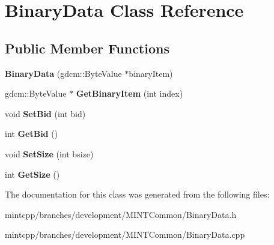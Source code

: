 \hypertarget{class_binary_data}{
\section{BinaryData Class Reference}
\label{class_binary_data}
}
\subsection*{Public Member Functions}
\begin{DoxyCompactItemize}
\item 
\hypertarget{class_binary_data_a21716fb138f92e5a4445ae1cb32dc981}{
{\bfseries BinaryData} (gdcm::ByteValue $\ast$binaryItem)}
\label{class_binary_data_a21716fb138f92e5a4445ae1cb32dc981}

\item 
\hypertarget{class_binary_data_ac204b216282db31e2eff91be6c89a729}{
gdcm::ByteValue $\ast$ {\bfseries GetBinaryItem} (int index)}
\label{class_binary_data_ac204b216282db31e2eff91be6c89a729}

\item 
\hypertarget{class_binary_data_a5c28dde97d7ecf4c7c3d150e4d6bab94}{
void {\bfseries SetBid} (int bid)}
\label{class_binary_data_a5c28dde97d7ecf4c7c3d150e4d6bab94}

\item 
\hypertarget{class_binary_data_abcc0c3a120d53a81b8054e080142db18}{
int {\bfseries GetBid} ()}
\label{class_binary_data_abcc0c3a120d53a81b8054e080142db18}

\item 
\hypertarget{class_binary_data_a933fd73c4caa8149be29c828a30a4afd}{
void {\bfseries SetSize} (int bsize)}
\label{class_binary_data_a933fd73c4caa8149be29c828a30a4afd}

\item 
\hypertarget{class_binary_data_a0eaa81d42582bc28f5baf087f8d59388}{
int {\bfseries GetSize} ()}
\label{class_binary_data_a0eaa81d42582bc28f5baf087f8d59388}

\end{DoxyCompactItemize}


The documentation for this class was generated from the following files:\begin{DoxyCompactItemize}
\item 
mintcpp/branches/development/MINTCommon/BinaryData.h\item 
mintcpp/branches/development/MINTCommon/BinaryData.cpp\end{DoxyCompactItemize}
